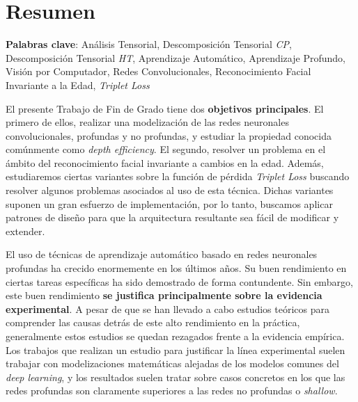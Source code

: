 %



\chapter{Resumen}

\textbf{Palabras clave}: Análisis Tensorial, Descomposición Tensorial \textit{CP}, Descomposición Tensorial \textit{HT}, Aprendizaje Automático, Aprendizaje Profundo, Visión por Computador, Redes Convolucionales, Reconocimiento Facial Invariante a la Edad, \textit{Triplet Loss}

El presente Trabajo de Fin de Grado tiene dos \textbf{objetivos principales}. El primero de ellos,  realizar una modelización de las redes neuronales convolucionales, profundas y no profundas, y estudiar la propiedad conocida comúnmente como \textit{depth efficiency}. El segundo, resolver un problema en el ámbito del reconocimiento facial invariante a cambios en la edad. Además, estudiaremos ciertas variantes sobre la función de pérdida \textit{Triplet Loss} buscando resolver algunos problemas asociados al uso de esta técnica. Dichas variantes suponen un gran esfuerzo de implementación, por lo tanto, buscamos aplicar patrones de diseño para que la arquitectura resultante sea fácil de modificar y extender.

El uso de técnicas de aprendizaje automático basado en redes neuronales profundas ha crecido enormemente en los últimos años. Su buen rendimiento en ciertas tareas específicas ha sido demostrado de forma contundente. Sin embargo, este buen rendimiento \textbf{se justifica principalmente sobre la evidencia experimental}. A pesar de que se han llevado a cabo estudios teóricos para comprender las causas detrás de este alto rendimiento en la práctica, generalmente estos estudios se quedan rezagados frente a la evidencia empírica. Los trabajos que realizan un estudio para justificar la línea experimental suelen trabajar con modelizaciones matemáticas alejadas de los modelos comunes del \textit{deep learning}, y los resultados suelen tratar sobre casos concretos en los que las redes profundas son claramente superiores a las redes no profundas o \textit{shallow}.


